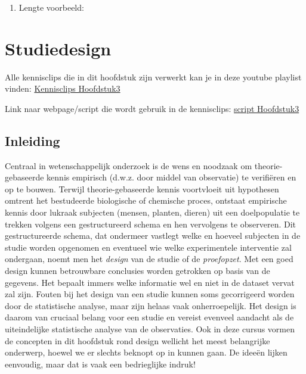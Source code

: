 \documentclass[
  12pt,dutch,coursenotes]{book}
\providecommand{\tightlist}{%
  \setlength{\itemsep}{0pt}\setlength{\parskip}{0pt}}
\theoremstyle{definition}
\theoremstyle{definition}
\theoremstyle{definition}
\theoremstyle{remark}
\begin{document}
\begin{enumerate}
\def\labelenumi{\arabic{enumi}.}
\setcounter{enumi}{1}
\tightlist
\item
  Lengte voorbeeld:
\end{enumerate}

\hypertarget{chap:design}{%
\chapter{Studiedesign}\label{chap:design}}

Alle kennisclips die in dit hoofdstuk zijn verwerkt kan je in deze youtube playlist vinden: \href{https://www.youtube.com/playlist?list=PLZH1hP8_LbJL1GjhnpEDlx78OJ6qUzSix}{Kennisclips Hoofdstuk3}

Link naar webpage/script die wordt gebruik in de kennisclips: \href{https://statomics.github.io/sbc20/rmd/03-experimentalDesign.html}{script Hoofdstuk3}

\hypertarget{inleiding}{%
\section{Inleiding}\label{inleiding}}

Centraal in wetenschappelijk onderzoek is de wens en noodzaak om
theorie-gebaseerde kennis empirisch (d.w.z. door middel van observatie) te
verifiëren en op te bouwen. Terwijl theorie-gebaseerde kennis voortvloeit uit hypothesen
omtrent het bestudeerde biologische of chemische proces, ontstaat empirische
kennis door lukraak subjecten (mensen, planten, dieren) uit een doelpopulatie te
trekken volgens een gestructureerd schema en hen vervolgens te observeren.
Dit gestructureerde schema, dat ondermeer vastlegt welke en hoeveel
subjecten in de studie worden opgenomen en eventueel wie welke experimentele
interventie zal ondergaan, noemt men het \emph{design} van de studie of de
\emph{proefopzet}. Met een goed design kunnen betrouwbare conclusies
worden getrokken op basis van de gegevens. Het bepaalt immers welke
informatie wel en niet in de dataset vervat zal zijn. Fouten bij het design
van een studie kunnen soms gecorrigeerd worden door de statistische analyse,
maar zijn helaas vaak onherroepelijk. Het design is daarom van cruciaal
belang voor een studie en vereist evenveel aandacht als de uiteindelijke
statistische analyse van de observaties. Ook in deze cursus vormen de
concepten in dit hoofdstuk rond design wellicht het meest
belangrijke onderwerp, hoewel we er slechts beknopt op in kunnen gaan. De
ideeën lijken eenvoudig, maar dat is vaak een bedrieglijke indruk!
\end{document}
